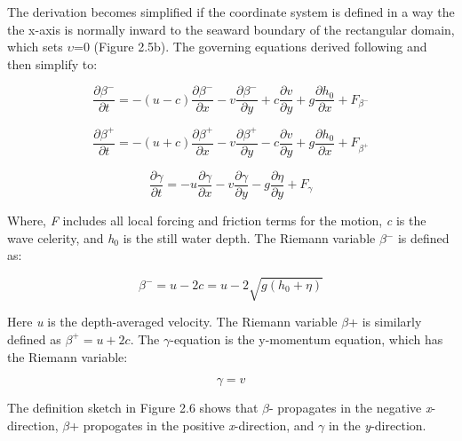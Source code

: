 The derivation becomes simplified if the coordinate system is defined in a way the the x-axis is normally inward to the seaward boundary of the rectangular domain, which sets $\upsilon $=0 (Figure 2.5b).  The governing equations derived following \citet{Abbott1979} and \citet{Verboom1981} then simplify to:

\begin{equation} \label{ZEqnNum327963} 
\frac{\partial \beta ^{-} }{\partial t} =-(u-c)\frac{\partial \beta ^{-} }{\partial x} -v\frac{\partial \beta ^{-} }{\partial y} +c\frac{\partial v}{\partial y} +g\frac{\partial h_{0} }{\partial x} +F_{\beta ^{-} }  
\end{equation} 

\begin{equation} \label{2.48)} 
\frac{\partial \beta ^{+} }{\partial t} =-(u+c)\frac{\partial \beta ^{+} }{\partial x} -v\frac{\partial \beta ^{+} }{\partial y} -c\frac{\partial v}{\partial y} +g\frac{\partial h_{0} }{\partial x} +F_{\beta ^{+} }  
\end{equation} 

\begin{equation} \label{ZEqnNum829814} 
\frac{\partial \gamma }{\partial t} =-u\frac{\partial \gamma }{\partial x} -v\frac{\partial \gamma }{\partial y} -g\frac{\partial \eta }{\partial y} +F_{\gamma }  
\end{equation} 

Where, \textit{F} includes all local forcing and friction terms for the motion, \textit{c} is the wave celerity, and \textit{h${}_{0}$} is the still water depth.  The Riemann variable \textit{$\beta $}${}^{-}$ is defined as: 

\begin{equation} \label{ZEqnNum437792} 
\beta ^{-} =u-2c=u-2\sqrt{g(h_{0} +\eta )}  
\end{equation} 

Here \textit{u} is the depth-averaged velocity. The Riemann variable $\beta $+ is similarly defined as $\beta^{+} = u + 2c$. The $\gamma$-equation is the y-momentum equation, which has the Riemann variable:

\begin{equation} \label{2.51)} 
\gamma =v 
\end{equation} 

The definition sketch in Figure 2.6 shows that  $\beta $- propagates in the negative \textit{x}-direction, $\beta $+ propogates in the positive \textit{x}-direction, and $\gamma $ in the \textit{y}-direction. 

